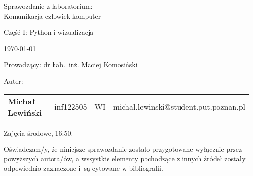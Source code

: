 \thispagestyle{empty} %

\begin{center}
{\large{Sprawozdanie z laboratorium:\\
Komunikacja człowiek-komputer\\
}}

\vspace{3ex}

Część I: Python i wizualizacja

\vspace{3ex}
{\footnotesize\today}

\end{center}


\vspace{10ex}

Prowadzący: dr hab.~inż. Maciej Komosiński

\vspace{5ex}

Autor:
\begin{tabular}{lllr}
\textbf{Michał Lewiński} & inf122505 & WI & michal.lewinski@student.put.poznan.pl \\
\end{tabular}

\vspace{5ex}

Zajęcia środowe, 16:50.

\vspace{35ex}

\noindent Oświadczam/y, że niniejsze sprawozdanie zostało przygotowane wyłącznie przez powyższych autora/ów,
a wszystkie elementy pochodzące z innych źródeł zostały odpowiednio zaznaczone i~są cytowane w bibliografii.

\newpage

